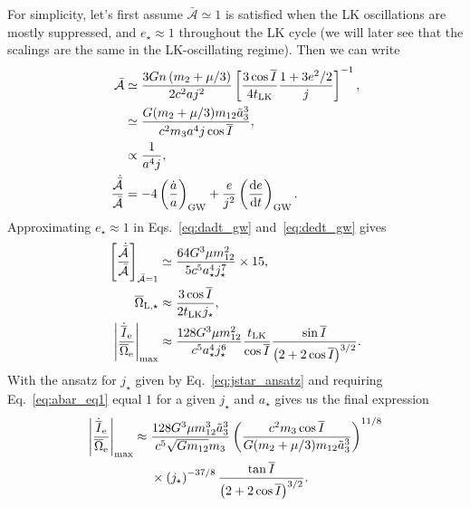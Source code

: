 \documentclass[
        fleqn,
        usenatbib,
    ]{mnras}
\newcommand*{\rd}[2]{\frac{\mathrm{d}#1}{\mathrm{d}#2}}
\newcommand*{\abs}[1]{\left|#1\right|}
\newcommand*{\p}[1]{\left(#1\right)}
\newcommand*{\s}[1]{\left[#1\right]}
\begin{document}
For simplicity, let's first assume $\bar{\mathcal{A}} \simeq 1$ is
satisfied when the LK oscillations are mostly suppressed, and $e_\star \approx
1$ throughout the LK cycle (we will later see that the scalings are the same in
the LK-oscillating regime). Then we can write
\begin{align}
    \bar{\mathcal{A}} &\simeq \frac{3Gn\p{m_2 + \mu/3}}{
        2c^2a j^2}
            \s{\frac{3\cos \overline{I}}{
                4t_{\rm LK}} \frac{1 + 3e^2/2}{j}}^{-1},\\
        &\simeq \frac{G(m_2 + \mu/3) m_{12}\tilde{a}_3^3}{
            c^2m_3a^4 j \cos \overline{I}},\label{eq:abar_eq1}\\
        &\propto \frac{1}{a^4j},\\
    \frac{\dot{\bar{\mathcal{A}}}}{\bar{\mathcal{A}}}
        &= -4\p{\frac{\dot{a}}{a}}_{\rm GW}
            + \frac{e}{j^2}\p{\rd{e}{t}}_{\rm GW}.
\end{align}
Approximating $e_\star \approx 1$ in Eqs.~\eqref{eq:dadt_gw} and~\eqref{eq:dedt_gw}
gives
\begin{align}
    \s{\frac{\dot{\bar{\mathcal{A}}}}{\bar{\mathcal{A}}}}_{
        \bar{\mathcal{A}} = 1}
        &\simeq \frac{64G^3 \mu m_{12}^2}{5c^5a_\star^4j_\star^7} \times 15,\\
    \overline{\Omega}_{\rm L, \star}
        &\approx \frac{3\cos \overline{I}}{2t_{\rm LK}j_\star},\\
    \abs{\frac{\dot{\overline{I}}_{\rm e}}{\overline{\Omega}_{\rm e}}}_{\max}
        &\approx \frac{128G^3 \mu m_{12}^2}{c^5 a_\star^4j_\star^6}
            \frac{t_{\rm LK}}{\cos \overline{I}}
            \frac{\sin \overline{I}}{\p{2 + 2\cos \overline{I}}^{3/2}}.
\end{align}
With the ansatz for $j_\star$ given by Eq.~\eqref{eq:jstar_ansatz} and requiring
Eq.~\eqref{eq:abar_eq1} equal $1$ for a given $j_\star$ and $a_\star$ gives us
the final expression
\begin{align}
    \abs{\frac{\dot{\overline{I}}_{\rm e}}{\overline{\Omega}_{\rm e}}}_{\max}
        \approx{}& \frac{128 G^3 \mu m_{12}^3 \tilde{a}_3^3}{c^5
        \sqrt{Gm_{12}} m_3}
            \p{\frac{c^2 m_3 \cos \overline{I}}{G(m_2 + \mu / 3) m_{12}
                \tilde{a}_3^3}}^{11/8}\nonumber\\
        &\times \p{j_\star}^{-37/8}
            \frac{\tan \overline{I}}{
            \p{2 + 2 \cos \overline{I}}^{3/2}}.\label{eq:prediction}
\end{align}
\end{document}
